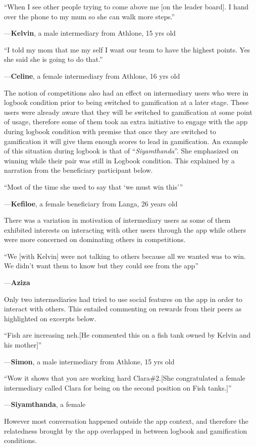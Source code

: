 \documentclass{sig-alternate}
\newenvironment{myquote}
               {\list{}{\rightmargin   \leftmargin
                        \parsep        0in }%
                \item\relax}
               {\endlist}
\newcommand{\userquote}[2]{\begin{samepage}\begin{myquote} 
     \em{\small{#2\begin{flushright}---#1\end{flushright}}}
   \end{myquote}\end{samepage}}
\begin{document}
\userquote{\textbf{Kelvin}, a male intermediary from Athlone, 15 yrs old} {``When I see other people trying to come above me [on the leader board]. I hand over the phone to my mum so she can walk more steps.''} 

\userquote{\textbf{Celine}, a female intermediary from Athlone, 16 yrs old} {``I told my mom that me my self I want our team to have the highest points. Yes she said she is going to do that.''} 

The notion of competitions also had an effect on intermediary users who were in logbook condition prior to being switched to gamification at a later stage. These users were already aware that they will be switched to gamification at some point of usage, therefore some of them took an extra initiative to engage with the app during logbook condition with premise that once they are switched to gamification it will give them enough scores to lead in gamification. An example of this situation during logbook is that of ``\emph{Siyamthanda}''. She emphasized on winning while their pair was still in Logbook condition. This explained by a narration from the beneficiary participant below.

\userquote{\textbf{Kefiloe}, a female beneficiary from Langa, 26 years old} {``Most of the time she used to say that `we must win this'''} 

There was a variation in motivation of intermediary users as some of them exhibited interests on interacting with other users through the app while others were more concerned on dominating others in competitions.

\userquote{\textbf{Aziza}} {``We [with Kelvin] were not talking to others because all we wanted was to win. We didn't want them to know but they could see from the app''}
 
Only two intermediaries had tried to use social features on the app in order to interact with others. This entailed commenting on rewards from their peers as highlighted on excerpts below.

\userquote{\textbf{Simon}, a male intermediary from Athlone, 15 yrs old} {``Fish are increasing neh.[He commented this on a fish tank owned by Kelvin and his mother]''} 

\userquote{\textbf{Siyamthanda}, a female } {``Wow it shows that you are working hard  Clara\#2.[She congratulated a female intermediary called Clara for being on the second position on Fish tanks.]''} 

However most conversation happened outside the app context, and therefore the relatedness brought by the app overlapped in between logbook and gamification conditions.
\end{document}
